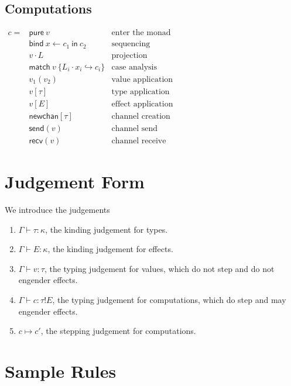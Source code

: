 \documentclass[12pt]{article}
\begin{document}
\subsection{Computations}

$\begin{array}{rll}
c =
  & \textsf{pure} \ v      & \text{enter the monad} \\
  & \textsf{bind} \
    x \leftarrow c_1 \
  \textsf{in} \ c_2      & \text{sequencing} \\
  & v \cdot L              & \text{projection} \\
  & \textsf{match} \ v \
    \{ L_i \cdot x_i
    \hookrightarrow c_i \} & \text{case analysis} \\
  & v_1(v_2)               & \text{value application} \\
  & v[\tau]                & \text{type application} \\
  & v[E]                   & \text{effect application} \\
  & \textsf{newchan}[\tau] & \text{channel creation} \\
  & \textsf{send}(v)       & \text{channel send} \\
  & \textsf{recv}(v)       & \text{channel receive}
\end{array}$

\newpage
\section{Judgement Form}

We introduce the judgements
\begin{enumerate}
\item $\Gamma \vdash \tau : \kappa$, the kinding judgement for types.
\item $\Gamma \vdash E : \kappa$, the kinding judgement for effects.
\item $\Gamma \vdash v : \tau$, the typing judgement for values, which do not
step and do not engender effects.
\item $\Gamma \vdash c : \tau!E$, the typing judgement for computations, which
do step and may engender effects.
\item $c \mapsto c'$, the stepping judgement for computations.
\end{enumerate}

\newpage
\section{Sample Rules}
\end{document}
